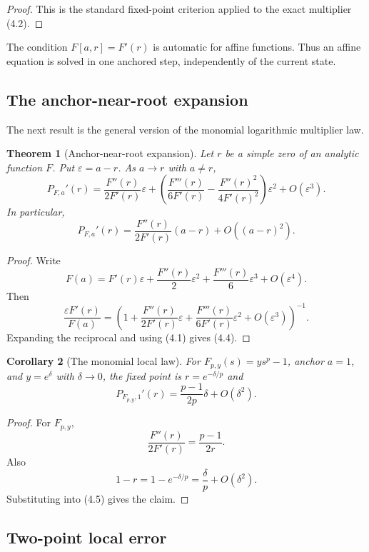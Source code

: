 \documentclass[11pt]{article}
\newtheorem{theorem}{Theorem}[section]
\newtheorem{corollary}[theorem]{Corollary}
\theoremstyle{definition}
\newcommand{\eps}{\varepsilon}
\begin{document}
\begin{proof}
This is the standard fixed-point criterion applied to the exact multiplier (4.2).
\end{proof}

The condition $F[a,r]=F'(r)$ is automatic for affine functions.  Thus an affine equation is solved in one anchored step, independently of the current state.

\subsection{The anchor-near-root expansion}

The next result is the general version of the monomial logarithmic multiplier law.

\begin{theorem}[Anchor-near-root expansion]
Let $r$ be a simple zero of an analytic function $F$.  Put $\eps=a-r$.  As $a\to r$ with $a\ne r$,
\[
        P_{F,a}'(r)
        =\frac{F''(r)}{2F'(r)}\eps
        +\left(
            \frac{F'''(r)}{6F'(r)}
            -\frac{F''(r)^2}{4F'(r)^2}
        \right)\eps^2
        +O(\eps^3).
        \tag{4.4}
\]
In particular,
\[
        P_{F,a}'(r)=\frac{F''(r)}{2F'(r)}(a-r)+O((a-r)^2).
        \tag{4.5}
\]
\end{theorem}

\begin{proof}
Write
\[
        F(a)=F'(r)\eps+\frac{F''(r)}{2}\eps^2+\frac{F'''(r)}{6}\eps^3+O(\eps^4).
\]
Then
\[
        \frac{\eps F'(r)}{F(a)}
        =\left(
            1+\frac{F''(r)}{2F'(r)}\eps
             +\frac{F'''(r)}{6F'(r)}\eps^2
             +O(\eps^3)
          \right)^{-1}.
\]
Expanding the reciprocal and using (4.1) gives (4.4).
\end{proof}

\begin{corollary}[The monomial local law]
For $F_{p,y}(s)=ys^p-1$, anchor $a=1$, and $y=e^\delta$ with $\delta\to0$, the fixed point is $r=e^{-\delta/p}$ and
\[
        P_{F_{p,y},1}'(r)=\frac{p-1}{2p}\delta+O(\delta^2).
\]
\end{corollary}

\begin{proof}
For $F_{p,y}$,
\[
        \frac{F''(r)}{2F'(r)}=\frac{p-1}{2r}.
\]
Also
\[
        1-r=1-e^{-\delta/p}=\frac{\delta}{p}+O(\delta^2).
\]
Substituting into (4.5) gives the claim.
\end{proof}

\subsection{Two-point local error}
\end{document}
